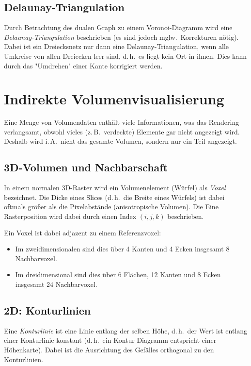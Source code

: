 \documentclass[a4paper, 11pt, accentcolor = tud3b]{tudreport}
\renewcommand{\dh}{d.\,h.~}
\newcommand{\zB}{z.\,B.~}
\newcommand{\iA}{i.\,A.~}
\newcommand{\mglw}{mglw.~}
\begin{document}
			\subsection{Delaunay-Triangulation}
				Durch Betrachtung des dualen Graph zu einem Voronoi-Diagramm wird eine \emph{Delaunay-Triangulation} beschrieben (es sind jedoch \mglw Korrekturen nötig). Dabei ist ein Dreiecksnetz nur dann eine Delaunay-Triangulation, wenn alle Umkreise von allen Dreiecken leer sind, \dh es liegt kein Ort in ihnen. Dies kann durch das "Umdrehen" einer Kante korrigiert werden.

		\section{Indirekte Volumenvisualisierung}
			Eine Menge von Volumendaten enthält viele Informationen, was das Rendering verlangsamt, obwohl vieles (\zB verdeckte) Elemente gar nicht angezeigt wird. Deshalb wird \iA nicht das gesamte Volumen, sondern nur ein Teil angezeigt.

			\subsection{3D-Volumen und Nachbarschaft}
				In einem normalen 3D-Raster wird ein Volumenelement (Würfel) als \emph{Voxel} bezeichnet. Die Dicke eines Slices (\dh die Breite eines Würfels) ist dabei oftmals größer als die Pixelabstände (anisotropische Volumen). Die Eine Rasterposition wird dabei durch einen Index \( (i, j, k) \) beschrieben.
				
				Ein Voxel ist dabei adjazent zu einem Referenzvoxel:
				\begin{itemize}
					\item Im zweidimensionalen sind dies über \num{4} Kanten und \num{4} Ecken insgesamt \num{8} Nachbarvoxel.
					\item Im dreidimensional sind dies über \num{6} Flächen, \num{12} Kanten und \num{8} Ecken insgesamt \num{24} Nachbarvoxel.
				\end{itemize}

			\subsection{2D: Konturlinien}
				Eine \emph{Konturlinie} ist eine Linie entlang der selben Höhe, \dh der Wert ist entlang einer Konturlinie konstant (\dh ein Kontur-Diagramm entspricht einer Höhenkarte). Dabei ist die Ausrichtung des Gefälles orthogonal zu den Konturlinien.
\end{document}
